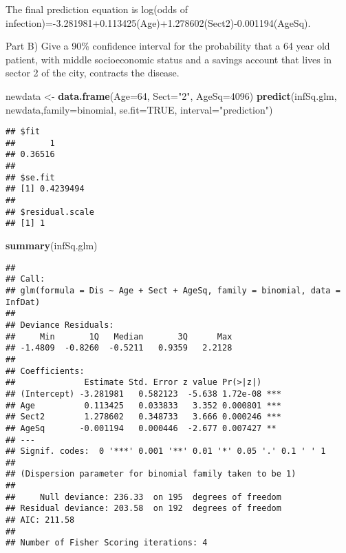 \documentclass[]{article}
\newenvironment{Shaded}{\begin{snugshade}}{\end{snugshade}}
\newcommand{\KeywordTok}[1]{\textcolor[rgb]{0.13,0.29,0.53}{\textbf{#1}}}
\newcommand{\DataTypeTok}[1]{\textcolor[rgb]{0.13,0.29,0.53}{#1}}
\newcommand{\DecValTok}[1]{\textcolor[rgb]{0.00,0.00,0.81}{#1}}
\newcommand{\StringTok}[1]{\textcolor[rgb]{0.31,0.60,0.02}{#1}}
\newcommand{\OtherTok}[1]{\textcolor[rgb]{0.56,0.35,0.01}{#1}}
\newcommand{\NormalTok}[1]{#1}
\begin{document}
The final prediction equation is log(odds of
infection)=-3.281981+0.113425(Age)+1.278602(Sect2)-0.001194(AgeSq).

Part B) Give a 90\% confidence interval for the probability that a 64
year old patient, with middle socioeconomic status and a savings account
that lives in sector 2 of the city, contracts the disease.

\begin{Shaded}
\begin{Highlighting}[]
\NormalTok{newdata <-}\StringTok{ }\KeywordTok{data.frame}\NormalTok{(}\DataTypeTok{Age=}\DecValTok{64}\NormalTok{, }\DataTypeTok{Sect=}\StringTok{"2"}\NormalTok{, }\DataTypeTok{AgeSq=}\DecValTok{4096}\NormalTok{)}
\KeywordTok{predict}\NormalTok{(infSq.glm, newdata,}\DataTypeTok{family=}\NormalTok{binomial, }\DataTypeTok{se.fit=}\OtherTok{TRUE}\NormalTok{,  }\DataTypeTok{interval=}\StringTok{"prediction"}\NormalTok{)}
\end{Highlighting}
\end{Shaded}

\begin{verbatim}
## $fit
##       1 
## 0.36516 
## 
## $se.fit
## [1] 0.4239494
## 
## $residual.scale
## [1] 1
\end{verbatim}

\begin{Shaded}
\begin{Highlighting}[]
\KeywordTok{summary}\NormalTok{(infSq.glm)}
\end{Highlighting}
\end{Shaded}

\begin{verbatim}
## 
## Call:
## glm(formula = Dis ~ Age + Sect + AgeSq, family = binomial, data = InfDat)
## 
## Deviance Residuals: 
##     Min       1Q   Median       3Q      Max  
## -1.4809  -0.8260  -0.5211   0.9359   2.2128  
## 
## Coefficients:
##              Estimate Std. Error z value Pr(>|z|)    
## (Intercept) -3.281981   0.582123  -5.638 1.72e-08 ***
## Age          0.113425   0.033833   3.352 0.000801 ***
## Sect2        1.278602   0.348733   3.666 0.000246 ***
## AgeSq       -0.001194   0.000446  -2.677 0.007427 ** 
## ---
## Signif. codes:  0 '***' 0.001 '**' 0.01 '*' 0.05 '.' 0.1 ' ' 1
## 
## (Dispersion parameter for binomial family taken to be 1)
## 
##     Null deviance: 236.33  on 195  degrees of freedom
## Residual deviance: 203.58  on 192  degrees of freedom
## AIC: 211.58
## 
## Number of Fisher Scoring iterations: 4
\end{verbatim}
\end{document}
